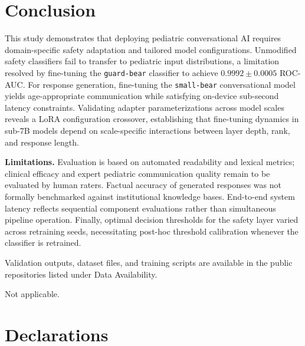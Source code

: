 \documentclass[pdflatex,sn-mathphys-num]{sn-jnl-official}%
\begin{document}
\section{Conclusion}\label{sec:conclusion}

This study demonstrates that deploying pediatric conversational AI requires domain-specific safety adaptation and tailored model configurations. Unmodified safety classifiers fail to transfer to pediatric input distributions, a limitation resolved by fine-tuning the \texttt{guard-bear} classifier to achieve $0.9992\pm0.0005$ ROC-AUC. For response generation, fine-tuning the \texttt{small-bear} conversational model yields age-appropriate communication while satisfying on-device sub-second latency constraints. Validating adapter parameterizations across model scales reveals a LoRA configuration crossover, establishing that fine-tuning dynamics in sub-7B models depend on scale-specific interactions between layer depth, rank, and response length.

\textbf{Limitations.} Evaluation is based on automated readability and lexical metrics; clinical efficacy and expert pediatric communication quality remain to be evaluated by human raters. Factual accuracy of generated responses was not formally benchmarked against institutional knowledge bases. End-to-end system latency reflects sequential component evaluations rather than simultaneous pipeline operation. Finally, optimal decision thresholds for the safety layer varied across retraining seeds, necessitating post-hoc threshold calibration whenever the classifier is retrained.

\backmatter


Validation outputs, dataset files, and training scripts are available in the public repositories listed under Data Availability.


Not applicable.

\section*{Declarations}
\end{document}
